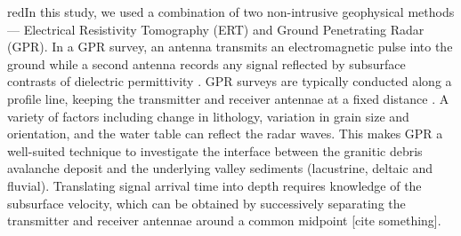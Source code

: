 \documentclass[utf8]{frontiersSCNS}
\newcommand{\alon}{\begin{color}{red}}
\newcommand{\aloff}{\end{color}}
\begin{document}
\alon In this study, we used a combination of two non-intrusive geophysical methods --- Electrical Resistivity Tomography (ERT) and Ground Penetrating Radar (GPR). In a GPR survey, an antenna transmits an electromagnetic pulse into the ground while a second antenna records any signal reflected by subsurface contrasts of dielectric permittivity \citep{neal2004ground}. GPR surveys are typically conducted along a profile line, keeping the transmitter and receiver antennae at a fixed distance  \citep{jol2008ground}. A variety of factors including change in lithology, variation in grain size and orientation, and the water table can reflect the radar waves. This makes GPR a well-suited technique to investigate the interface between the granitic debris avalanche deposit and the underlying  valley sediments (lacustrine, deltaic and fluvial).   
Translating signal arrival time into depth requires knowledge of the subsurface velocity, which can be obtained by successively separating the transmitter and receiver antennae around a common midpoint [cite something]. \aloff
\end{document}
